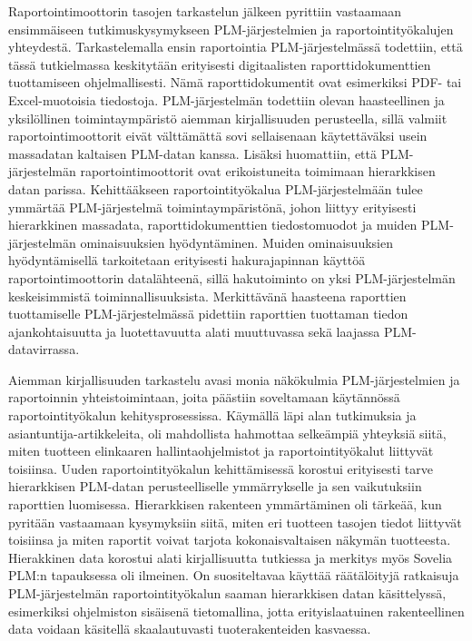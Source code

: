 Raportointimoottorin tasojen tarkastelun jälkeen pyrittiin vastaamaan ensimmäiseen tutkimuskysymykseen PLM-järjestelmien ja raportointityökalujen yhteydestä. Tarkastelemalla ensin raportointia PLM-järjestelmässä todettiin, että tässä tutkielmassa keskitytään erityisesti digitaalisten raporttidokumenttien tuottamiseen ohjelmallisesti. Nämä raporttidokumentit ovat esimerkiksi PDF- tai Excel-muotoisia tiedostoja. PLM-järjestelmän todettiin olevan haasteellinen ja yksilöllinen toimintaympäristö aiemman kirjallisuuden perusteella, sillä valmiit raportointimoottorit eivät välttämättä sovi sellaisenaan käytettäväksi usein massadatan kaltaisen PLM-datan kanssa. \cite{rohleder_requirements_2014} Lisäksi huomattiin, että PLM-järjestelmän raportointimoottorit ovat erikoistuneita toimimaan hierarkkisen datan parissa. \cite{rohleder_requirements_2014} Kehittääkseen raportointityökalua PLM-järjestelmään tulee ymmärtää PLM-järjestelmä toimintaympäristönä, johon liittyy erityisesti hierarkkinen massadata, raporttidokumenttien tiedostomuodot ja muiden PLM-järjestelmän ominaisuuksien hyödyntäminen. Muiden ominaisuuksien hyödyntämisellä tarkoitetaan erityisesti hakurajapinnan käyttöä raportointimoottorin datalähteenä, sillä hakutoiminto on yksi PLM-järjestelmän keskeisimmistä toiminnallisuuksista. \cite{enriquez_approach_2019} Merkittävänä haasteena raporttien tuottamiselle PLM-järjestelmässä pidettiin raporttien tuottaman tiedon ajankohtaisuutta ja luotettavuutta alati muuttuvassa sekä laajassa PLM-datavirrassa. \cite{german_challenge_2016} 

Aiemman kirjallisuuden tarkastelu avasi monia näkökulmia PLM-järjestelmien ja raportoinnin yhteistoimintaan, joita päästiin soveltamaan käytännössä raportointityökalun kehitysprosessissa. Käymällä läpi alan tutkimuksia ja asiantuntija-artikkeleita, oli mahdollista hahmottaa selkeämpiä yhteyksiä siitä, miten tuotteen elinkaaren hallintaohjelmistot ja raportointityökalut liittyvät toisiinsa. Uuden raportointityökalun kehittämisessä korostui erityisesti tarve  hierarkkisen PLM-datan perusteelliselle ymmärrykselle ja sen vaikutuksiin raporttien luomisessa. Hierarkkisen rakenteen ymmärtäminen oli tärkeää, kun pyritään vastaamaan kysymyksiin siitä, miten eri tuotteen tasojen tiedot liittyvät toisiinsa ja miten raportit voivat tarjota kokonaisvaltaisen näkymän tuotteesta. Hierakkinen data korostui alati kirjallisuutta tutkiessa ja merkitys myös Sovelia PLM:n tapauksessa oli ilmeinen. On suositeltavaa käyttää räätälöityjä ratkaisuja PLM-järjestelmän raportointityökalun saaman hierarkkisen datan käsittelyssä, esimerkiksi ohjelmiston sisäisenä tietomallina, jotta erityislaatuinen rakenteellinen data voidaan käsitellä skaalautuvasti tuoterakenteiden kasvaessa.

